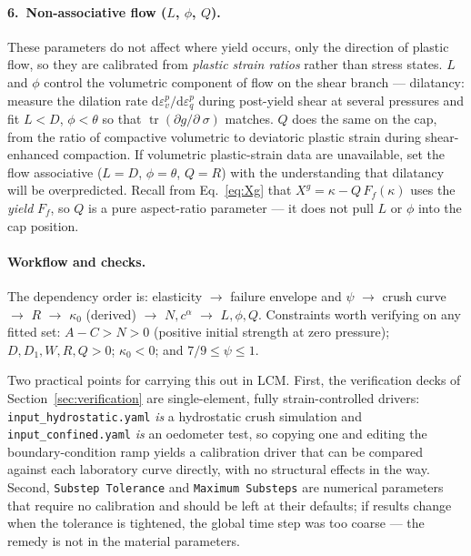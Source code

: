 \documentclass[12pt]{article}
\DeclareMathOperator{\trace}{tr}
\newcommand{\stress}{~\sigma}
\begin{document}
\paragraph{6.\ Non-associative flow ($L$, $\phi$, $Q$).}
These parameters do not affect where yield occurs, only the direction
of plastic flow, so they are calibrated from \emph{plastic strain
ratios} rather than stress states. $L$ and $\phi$ control the
volumetric component of flow on the shear branch --- dilatancy:
measure the dilation rate
$\mathrm{d}\varepsilon_v^p/\mathrm{d}\varepsilon_q^p$ during
post-yield shear at several pressures and fit $L < D$,
$\phi < \theta$ so that $\trace(\partial g/\partial\stress)$ matches.
$Q$ does the same on the cap, from the ratio of compactive volumetric
to deviatoric plastic strain during shear-enhanced compaction. If
volumetric plastic-strain data are unavailable, set the flow
associative ($L = D$, $\phi = \theta$, $Q = R$) with the
understanding that dilatancy will be overpredicted. Recall from
Eq.~\eqref{eq:Xg} that $X^g = \kappa - Q\,F_f(\kappa)$ uses the
\emph{yield} $F_f$, so $Q$ is a pure aspect-ratio parameter --- it
does not pull $L$ or $\phi$ into the cap position.

\paragraph{Workflow and checks.}
The dependency order is: elasticity $\to$ failure envelope and $\psi$
$\to$ crush curve $\to$ $R$ $\to$ $\kappa_0$ (derived) $\to$
$N, c^\alpha$ $\to$ $L, \phi, Q$. Constraints worth verifying on any
fitted set: $A - C > N > 0$ (positive initial strength at zero
pressure); $D, D_1, W, R, Q > 0$; $\kappa_0 < 0$; and
$7/9 \le \psi \le 1$.

Two practical points for carrying this out in LCM. First, the
verification decks of Section~\ref{sec:verification} are
single-element, fully strain-controlled drivers:
\texttt{input\_hydrostatic.yaml} \emph{is} a hydrostatic crush
simulation and \texttt{input\_confined.yaml} \emph{is} an oedometer
test, so copying one and editing the boundary-condition ramp yields a
calibration driver that can be compared against each laboratory curve
directly, with no structural effects in the way. Second,
\texttt{Substep Tolerance} and \texttt{Maximum Substeps} are
numerical parameters that require no calibration and should be left
at their defaults; if results change when the tolerance is
tightened, the global time step was too coarse --- the remedy is not
in the material parameters.
\end{document}
